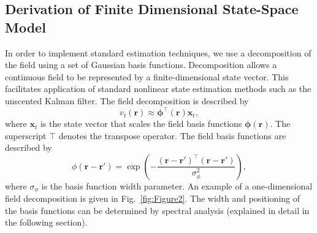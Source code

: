 \documentclass[5p,authoryear]{elsarticle}
\begin{document}
\subsection{Derivation of Finite Dimensional State-Space Model}\label{Sect:ReducedModelDerivation}
In order to implement standard estimation techniques, we use a decomposition of the field using a set of Gaussian basis functions. Decomposition allows a continuous field to be represented by a finite-dimensional state vector. This facilitates application of standard nonlinear state estimation methods such as the unscented Kalman filter. The field decomposition is described by
\begin{equation}
	\label{DefFieldDecomp} v_t\left(\mathbf{r}\right) \approx \boldsymbol{\phi}^{\top}\left(\mathbf{r}\right) \mathbf{x}_t, 
\end{equation}
where $\mathbf{x}_t$ is the state vector that scales the field basis functions $\mathbf{\boldsymbol{\phi}}(\mathbf{r})$. The superscript $\top$ denotes the transpose operator. The field basis functions are described by
\begin{equation}\label{eq:FieldBasisFunction}
	\phi\left(\mathbf{r}-\mathbf{r}'\right) =
\exp{\left(-\frac{(\mathbf{r}-\mathbf{r}')^\top(\mathbf{r}-\mathbf{r}')}{\sigma_{\phi}^2}\right)}, 
\end{equation}
where $\sigma_{\phi}$ is the basis function width parameter. An example of a one-dimensional field decomposition is given in Fig.~\ref{fig:Figure2}. The width and positioning of the basis functions can be determined by spectral analysis (explained in detail in the following section). 
\end{document}
